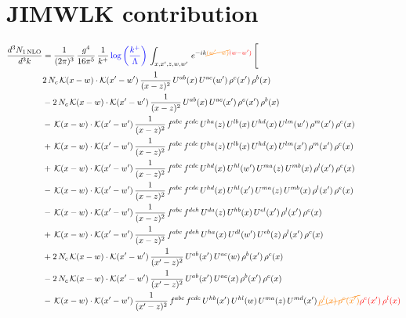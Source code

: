 \documentclass[9pt]{article}
\numberwithin{equation}{section}
\begin{document}
\section{JIMWLK contribution}
\begin{align}
\frac{d^{3}N_{1\,\mathrm{NLO}}}{d^{3}k} & = \frac{1}{(2\pi)^{3}}\,\frac{g^{4}}{16\pi^{5}}\,\frac{1}{k^{+}}\,{\color{blue}\log{\left(\frac{k^{+}}{\Lambda}\right)}}\,\int_{x,x',z,w,w'}\,e^{-ik{\color{orange}\cancel{(w'-w)}}{\color{red}(w-w')}}\,\Bigg[\notag\\
&2\,N_{c}\,\mathcal{K}(x-w)\cdot\mathcal{K}(x'-w')\,\frac{1}{(x-z)^{2}}\,U^{ab}(x)\,U^{ac}(w')\,\rho^{c}(x')\,\rho^{b}(x)\notag\\
&-2\,N_{c}\,\mathcal{K}(x-w)\cdot\mathcal{K}(x'-w')\,\frac{1}{(x-z)^{2}}\,U^{ab}(x)\,U^{ac}(x')\,\rho^{c}(x')\,\rho^{b}(x)\notag\\
&-\,\mathcal{K}(x-w)\cdot\mathcal{K}(x'-w')\,\frac{1}{(x-z)^{2}}\,f^{abc}\,f^{cde}\,U^{ha}(z)\,U^{lb}(x)\,U^{hd}(x)\,U^{lm}(w')\,\rho^{m}(x')\,\rho^{e}(x)\notag\\
&+\,\mathcal{K}(x-w)\cdot\mathcal{K}(x'-w')\,\frac{1}{(x-z)^{2}}\,f^{abc}\,f^{cde}\,U^{ha}(z)\,U^{lb}(x)\,U^{hd}(x)\,U^{lm}(x')\,\rho^{m}(x')\,\rho^{e}(x)\notag\\
&+\,\mathcal{K}(x-w)\cdot\mathcal{K}(x'-w')\,\frac{1}{(x-z)^{2}}\,f^{abc}\,f^{cde}\,U^{hd}(x)\,U^{hl}(w')\,U^{ma}(z)\,U^{mb}(x)\,\rho^{l}(x')\,\rho^{e}(x)\notag\\
&-\,\mathcal{K}(x-w)\cdot\mathcal{K}(x'-w')\,\frac{1}{(x-z)^{2}}\,f^{abc}\,f^{cde}\,U^{hd}(x)\,U^{hl}(x')\,U^{ma}(z)\,U^{mb}(x)\,\rho^{l}(x')\,\rho^{e}(x)\notag\\
&-\,\mathcal{K}(x-w)\cdot\mathcal{K}(x'-w')\,\frac{1}{(x-z)^{2}}\,f^{abc}\,f^{deh}\,U^{da}(z)\,U^{hb}(x)\,U^{el}(x')\,\rho^{l}(x')\,\rho^{c}(x)\notag\\
&+\,\mathcal{K}(x-w)\cdot\mathcal{K}(x'-w')\,\frac{1}{(x-z)^{2}}\,f^{abc}\,f^{deh}\,U^{ha}(x)\,U^{dl}(w')\,U^{eb}(z)\,\rho^{l}(x')\,\rho^{c}(x)\notag\\
&+2\,N_{c}\,\mathcal{K}(x-w)\cdot\mathcal{K}(x'-w')\,\frac{1}{(x'-z)^{2}}\,U^{ab}(x')\,U^{ac}(w)\,\rho^{b}(x')\,\rho^{c}(x)\notag\\
&-2\,N_{c}\,\mathcal{K}(x-w)\cdot\mathcal{K}(x'-w')\,\frac{1}{(x'-z)^{2}}\,U^{ab}(x')\,U^{ac}(x)\,\rho^{b}(x')\,\rho^{c}(x)\notag\\
&-\,\mathcal{K}(x-w)\cdot\mathcal{K}(x'-w')\,\frac{1}{(x'-z)^{2}}\,f^{abc}\,f^{cde}\,U^{hb}(x')\,U^{hl}(w)\,U^{ma}(z)\,U^{md}(x')\,{\color{orange}\cancel{\rho^{l}(x)\,\rho^{e}(x')}}{\color{red}\rho^{e}(x')\,\rho^{l}(x)}\notag\\

\end{align}
\end{document}
